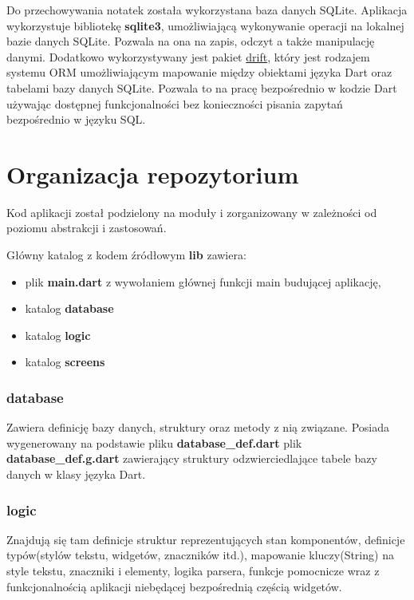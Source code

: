 Do przechowywania notatek została wykorzystana baza danych SQLite. Aplikacja wykorzystuje bibliotekę \textbf{sqlite3}, umożliwiającą wykonywanie operacji na lokalnej bazie danych SQLite. Pozwala na ona na zapis, odczyt a także manipulację danymi. Dodatkowo wykorzystywany jest pakiet \href{https://pub.dev/packages/drift}{drift}, który jest rodzajem systemu ORM umożliwiającym mapowanie między obiektami języka Dart oraz tabelami bazy danych SQLite. Pozwala to na pracę bezpośrednio w kodzie Dart używając dostępnej funkcjonalności bez konieczności pisania zapytań bezpośrednio w języku SQL.

\section{Organizacja repozytorium}

Kod aplikacji został podzielony na moduły i zorganizowany w zależności od poziomu abstrakcji i zastosowań.

Główny katalog z kodem źródłowym \textbf{lib} zawiera:

\begin{itemize}
    \item plik \textbf{main.dart} z wywołaniem głównej funkcji main budującej aplikację,
    \item katalog \textbf{database}
    \item katalog \textbf{logic}
    \item katalog \textbf{screens}
\end{itemize}

\subsubsection{database}

Zawiera definicję bazy danych, struktury oraz metody z nią związane. Posiada wygenerowany na podstawie pliku \textbf{database\_{}def.dart} plik \textbf{database\_{}def.g.dart} zawierający struktury odzwierciedlające tabele bazy danych w klasy języka Dart. 

\subsubsection{logic}

Znajdują się tam definicje struktur reprezentujących stan komponentów, definicje typów(stylów tekstu, widgetów, znaczników itd.), mapowanie kluczy(String) na style tekstu, znaczniki i elementy, logika parsera, funkcje pomocnicze wraz z funkcjonalnością aplikacji niebędącej bezpośrednią częścią widgetów.

